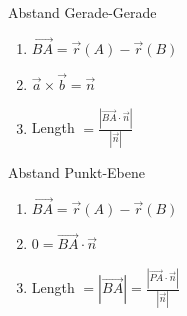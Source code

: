 \begin{KR}{Abstand Gerade-Gerade}
    \begin{enumerate}
        \item $\overrightarrow{BA} = \overrightarrow{r}(A) - \overrightarrow{r}(B)$
        \item $\overrightarrow{a} \times \overrightarrow{b} = \overrightarrow{n}$
        \item Length $= \frac{|\overrightarrow{BA} \cdot \overrightarrow{n}|}{|\overrightarrow{n}|}$
    \end{enumerate}
\end{KR}

\begin{KR}{Abstand Punkt-Ebene}
    \begin{enumerate}
        \item $\overrightarrow{BA} = \overrightarrow{r}(A) - \overrightarrow{r}(B)$
        \item $0 = \overrightarrow{BA} \cdot \overrightarrow{n}$
        \item Length $= |\overrightarrow{BA}| = \frac{|\overrightarrow{PA} \cdot \overrightarrow{n}|}{|\overrightarrow{n}|}$
    \end{enumerate}
\end{KR}











